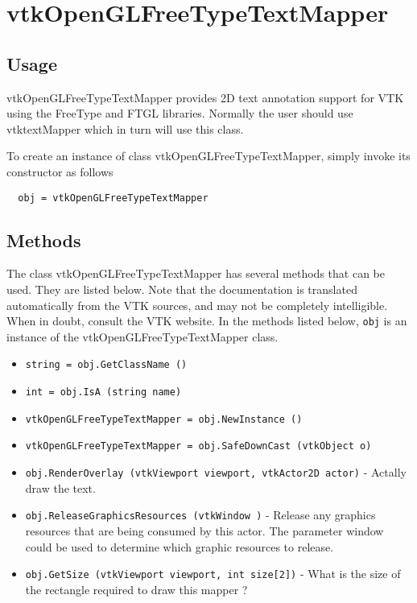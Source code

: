 \section{vtkOpenGLFreeTypeTextMapper}

\subsection{Usage}

 vtkOpenGLFreeTypeTextMapper provides 2D text annotation support for VTK
 using the FreeType and FTGL libraries. Normally the user should use 
 vtktextMapper which in turn will use this class.

To create an instance of class vtkOpenGLFreeTypeTextMapper, simply
invoke its constructor as follows
\begin{verbatim}
  obj = vtkOpenGLFreeTypeTextMapper
\end{verbatim}
\subsection{Methods}

The class vtkOpenGLFreeTypeTextMapper has several methods that can be used.
  They are listed below.
Note that the documentation is translated automatically from the VTK sources,
and may not be completely intelligible.  When in doubt, consult the VTK website.
In the methods listed below, \verb|obj| is an instance of the vtkOpenGLFreeTypeTextMapper class.
\begin{itemize}
\item  \verb|string = obj.GetClassName ()|

\item  \verb|int = obj.IsA (string name)|

\item  \verb|vtkOpenGLFreeTypeTextMapper = obj.NewInstance ()|

\item  \verb|vtkOpenGLFreeTypeTextMapper = obj.SafeDownCast (vtkObject o)|

\item  \verb|obj.RenderOverlay (vtkViewport viewport, vtkActor2D actor)| -  Actally draw the text.

\item  \verb|obj.ReleaseGraphicsResources (vtkWindow )| -  Release any graphics resources that are being consumed by this actor.
 The parameter window could be used to determine which graphic
 resources to release.

\item  \verb|obj.GetSize (vtkViewport viewport, int size[2])| -  What is the size of the rectangle required to draw this
 mapper ?

\end{itemize}
